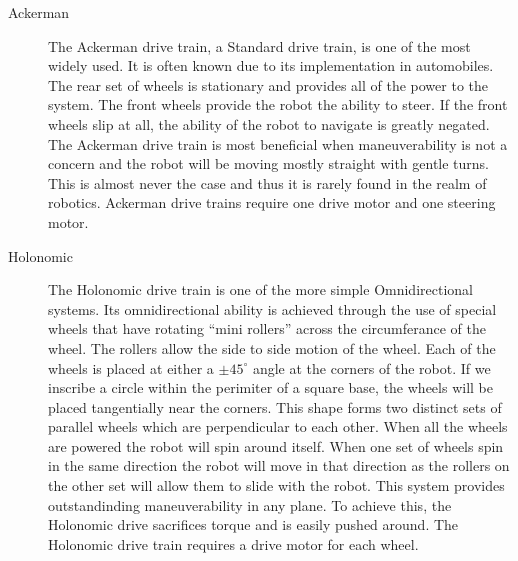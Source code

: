 \documentclass[a4paper]{article}
\begin{document}
\begin{description}
\item[Ackerman] The Ackerman drive train, a Standard drive train, is one of the most widely used. It is often known due to its implementation in automobiles. The rear set of wheels is stationary and provides all of the power to the system. The front wheels provide the robot the ability to steer. If the front wheels slip at all, the ability of the robot to navigate is greatly negated. The Ackerman drive train is most beneficial when maneuverability is not a concern and the robot will be moving mostly straight with gentle turns. This is almost never the case and thus it is rarely found in the realm of robotics. Ackerman drive trains require one drive motor and one steering motor. 

\item[Holonomic] The Holonomic drive train is one of the more simple Omnidirectional systems. Its omnidirectional ability is achieved through the use of special wheels that have rotating ``mini rollers'' across the circumferance of the wheel. The rollers allow the side to side motion of the wheel. Each of the wheels is placed at either a $\pm 45^\circ$ angle at the corners of the robot. If we inscribe a circle within the perimiter of a square base, the wheels will be placed tangentially near the corners. This shape forms two distinct sets of parallel wheels which are perpendicular to each other. When all the wheels are powered the robot will spin around itself. When one set of wheels spin in the same direction the robot will move in that direction as the rollers on the other set will allow them to slide with the robot. This system provides outstandinding maneuverability in any plane. To achieve this, the Holonomic drive sacrifices torque and is easily pushed around. The Holonomic drive train requires a drive motor for each wheel. 
\end{description}
\end{document}
